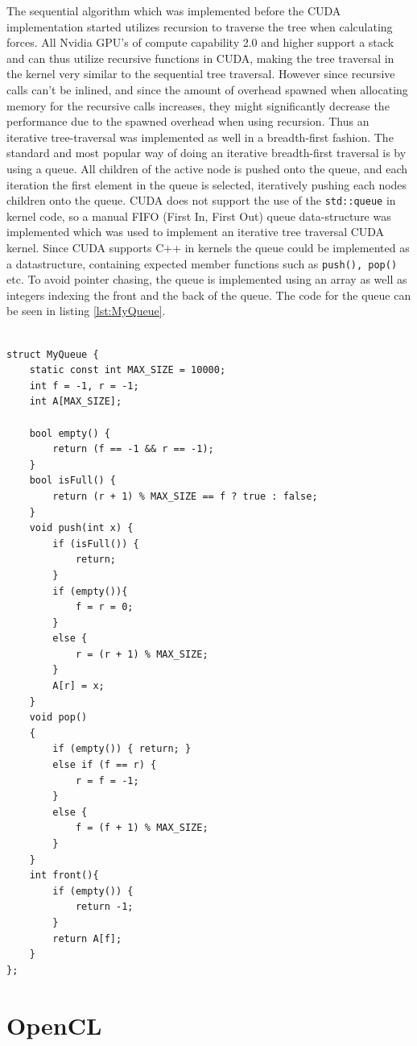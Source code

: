 The sequential algorithm which was implemented before the CUDA implementation started utilizes recursion to traverse the tree when calculating forces. All Nvidia GPU's of compute capability 2.0 and higher support a stack and can thus utilize recursive functions in CUDA, making the tree traversal in the kernel very similar to the sequential tree traversal. However since recursive calls can't be inlined, and since the amount of overhead spawned when allocating memory for the recursive calls increases, they might significantly decrease the performance due to the spawned overhead when using recursion. Thus an iterative tree-traversal was implemented as well in a breadth-first fashion. The standard and most popular way of doing an iterative breadth-first traversal is by using a queue. All children of the active node is pushed onto the queue, and each iteration the first element in the queue is selected, iteratively pushing each nodes children onto the queue. CUDA does not support the use of the \lstinline{std::queue} in kernel code, so a manual FIFO (First In, First Out) queue data-structure was implemented which was used to implement an iterative tree traversal CUDA kernel.
Since CUDA supports C++ in kernels the queue could be implemented as a datastructure, containing expected member functions such as \lstinline{push(), pop()} etc. To avoid pointer chasing, the queue is implemented using an array as well as integers indexing the front and the back of the queue. The code for the queue can be seen in listing \ref{lst:MyQueue}.




\clearpage
\begin{lstlisting}[caption={Device queue used for iterative traversal of the tree}, label={lst:MyQueue}, frame=single] 

struct MyQueue {
	static const int MAX_SIZE = 10000;
	int f = -1, r = -1;
	int A[MAX_SIZE];

	bool empty() {
		return (f == -1 && r == -1);
	}
	bool isFull() {
		return (r + 1) % MAX_SIZE == f ? true : false;
	}
	void push(int x) {
		if (isFull()) {
			return;
		}
		if (empty()){
			f = r = 0;
		}
		else {
			r = (r + 1) % MAX_SIZE;
		}
		A[r] = x;
	}
	void pop()
	{
		if (empty()) { return; }
		else if (f == r) {
			r = f = -1;
		}
		else {
			f = (f + 1) % MAX_SIZE;
		}
	}
	int front(){
		if (empty()) {
			return -1;
		}
		return A[f];
	}
};
\end{lstlisting}


\section{OpenCL} \label{sec:OpenCLImplementation}

